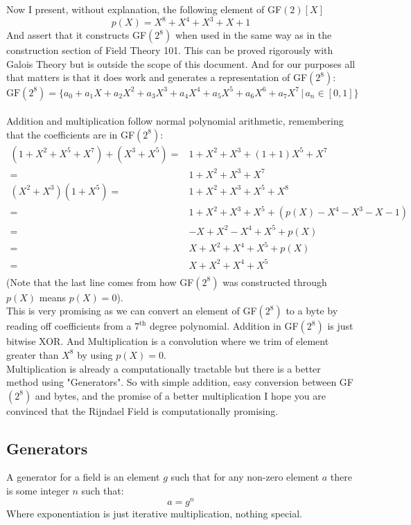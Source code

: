 Now I present, without explanation, the following element of GF$(2)[X]$
\[p(X) = X^8+X^4+X^3+X+1\]
And assert that it constructs GF$(2^8)$ when used in the same way as in the construction section of Field Theory 101.
This can be proved rigorously with Galois Theory but is outside the scope of this document.
And for our purposes all that matters is that it does work and generates a representation of GF$(2^8)$:
\[\text{GF}(2^8) = \{a_0 + a_1X+a_2X^2+a_3X^3+a_4X^4+a_5X^5+a_6X^6+a_7X^7\,|\,a_n\in[0,1]\}\]
\\

Addition and multiplication follow normal polynomial arithmetic,
remembering that the coefficients are in GF$(2^8)$:
\begin{equation*}
\begin{aligned}
	(1+X^2+X^5+X^7) + (X^3+X^5) =& 1+X^2 +X^3+(1+1)X^5+X^7\\
	=& 1+X^2 +X^3 +X^7\\
	(X^2+X^3) (1+X^5) =& 1+X^2+X^3+X^5+X^8 \\
	=& 1+X^2+X^3+X^5+(p(X)-X^4-X^3-X-1) \\
	=& -X+X^2-X^4+X^5+p(X) \\
	=& X+X^2+X^4+X^5+p(X) \\
	=& X+X^2+X^4+X^5 \\
\end{aligned}
\end{equation*}
(Note that the last line comes from how GF$(2^8)$ was constructed through $p(X)$ means $p(X) = 0$).
\\

This is very promising as we can convert an element of GF$(2^8)$ to a byte by reading off coefficients from a $7^\text{th}$ degree polynomial.
Addition in GF$(2^8)$ is just bitwise XOR.
And Multiplication is a convolution where we trim of element greater than $X^8$ by using $p(X)=0$. 
\\

Multiplication is already a computationally tractable but there is a better method using "Generators".
So with simple addition, easy conversion between GF$(2^8)$ and bytes, and the promise of a better multiplication I hope you are convinced that the Rijndael Field is computationally promising.

\subsection{Generators}
A generator for a field is an element $g$ such that for any non-zero element $a$ there is some integer $n$ such that:
\[ a = g^n\]
Where exponentiation is just iterative multiplication, nothing special.
\\


